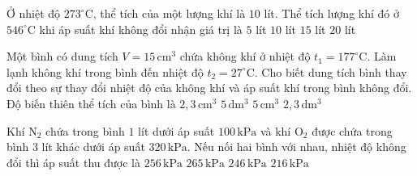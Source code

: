 \begin{ex}
Ở nhiệt độ $273^\circ\mathrm{C}$, thể tích của một lượng khí là $10$ lít. Thể tích lượng khí đó ở $546^\circ\mathrm{C}$ khi áp suất khí không đổi nhận giá trị là
\choice
{$5$ lít}
{$10$ lít}
{\True $15$ lít}
{$20$ lít}
\end{ex}

\begin{ex}
Một bình có dung tích $V=15\,\mathrm{cm^3}$ chứa không khí ở nhiệt độ $t_1=177^\circ\mathrm{C}$. Làm lạnh không khí trong bình đến nhiệt độ $t_2=27^\circ\mathrm{C}$. Cho biết dung tích bình thay đổi theo sự thay đổi nhiệt độ của không khí và áp suất khí trong bình không đổi. Độ biến thiên thể tích của bình là
\choice
{$2,3\,\mathrm{cm^3}$}
{$5\,\mathrm{dm^3}$}
{\True $5\,\mathrm{cm^3}$}
{$2,3\,\mathrm{dm^3}$}
\end{ex}

\begin{ex}
Khí $\mathrm{N_2}$ chứa trong bình $1$ lít dưới áp suất $100\,\mathrm{kPa}$ và khí $\mathrm{O_2}$ được chứa trong bình $3$ lít khác dưới áp suất $320\,\mathrm{kPa}$. Nếu nối hai bình với nhau, nhiệt độ không đổi thì áp suất thu được là
\choice
{$256\,\mathrm{kPa}$}
{\True $265\,\mathrm{kPa}$}
{$246\,\mathrm{kPa}$}
{$216\,\mathrm{kPa}$}
\end{ex}

